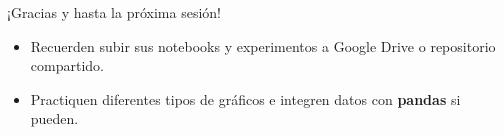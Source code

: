 \documentclass[10pt]{beamer}
\begin{document}
\begin{frame}
  \Huge{\centerline{¡Gracias y hasta la próxima sesión!}}
  \vspace{0.4cm}
  \normalsize
  \begin{itemize}
    \item Recuerden subir sus notebooks y experimentos a Google Drive o repositorio compartido.
    \item Practiquen diferentes tipos de gráficos e integren datos con \textbf{pandas} si pueden.
  \end{itemize}
\end{frame}
\end{document}
